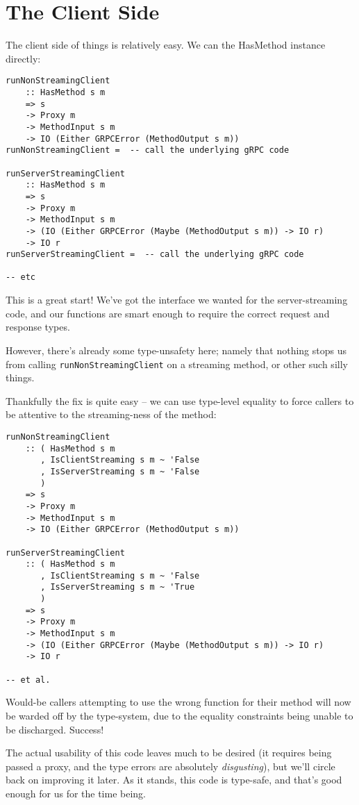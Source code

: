 \section{The Client Side}

The client side of things is relatively easy. We can the HasMethod instance directly:

\begin{verbatim}
runNonStreamingClient
    :: HasMethod s m
    => s
    -> Proxy m
    -> MethodInput s m
    -> IO (Either GRPCError (MethodOutput s m))
runNonStreamingClient =  -- call the underlying gRPC code

runServerStreamingClient
    :: HasMethod s m
    => s
    -> Proxy m
    -> MethodInput s m
    -> (IO (Either GRPCError (Maybe (MethodOutput s m)) -> IO r)
    -> IO r
runServerStreamingClient =  -- call the underlying gRPC code

-- etc
\end{verbatim}
This is a great start! We've got the interface we wanted for the server-streaming code, and our functions are smart enough to require the correct request and response types.

However, there's already some type-unsafety here; namely that nothing stops us from calling \texttt{runNonStreamingClient} on a streaming method, or other such silly things.

Thankfully the fix is quite easy -- we can use type-level equality to force callers to be attentive to the streaming-ness of the method:

\begin{verbatim}
runNonStreamingClient
    :: ( HasMethod s m
       , IsClientStreaming s m ~ 'False
       , IsServerStreaming s m ~ 'False
       )
    => s
    -> Proxy m
    -> MethodInput s m
    -> IO (Either GRPCError (MethodOutput s m))

runServerStreamingClient
    :: ( HasMethod s m
       , IsClientStreaming s m ~ 'False
       , IsServerStreaming s m ~ 'True
       )
    => s
    -> Proxy m
    -> MethodInput s m
    -> (IO (Either GRPCError (Maybe (MethodOutput s m)) -> IO r)
    -> IO r

-- et al.
\end{verbatim}
Would-be callers attempting to use the wrong function for their method will now be warded off by the type-system, due to the equality constraints being unable to be discharged. Success!

The actual usability of this code leaves much to be desired (it requires being passed a proxy, and the type errors are absolutely \textit{disgusting}), but we'll circle back on improving it later. As it stands, this code is type-safe, and that's good enough for us for the time being.


